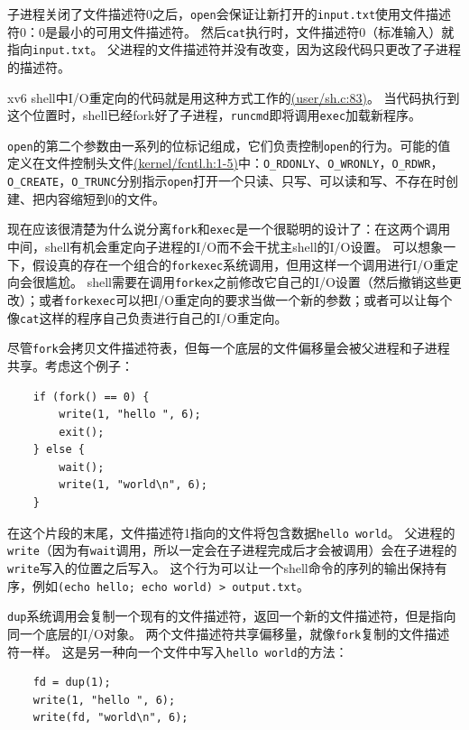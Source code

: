 子进程关闭了文件描述符0之后，\texttt{open}会保证让新打开的\texttt{input.txt}使用文件描述符0：0是最小的可用文件描述符。
然后\texttt{cat}执行时，文件描述符0（标准输入）就指向\texttt{input.txt}。
父进程的文件描述符并没有改变，因为这段代码只更改了子进程的描述符。

xv6 shell中I/O重定向的代码就是用这种方式工作的\href{https://github.com/mit-pdos/xv6-riscv/blob/risc/user/sh.c#L83}{(user/sh.c:83)}。
当代码执行到这个位置时，shell已经fork好了子进程，\texttt{runcmd}即将调用\texttt{exec}加载新程序。

\texttt{open}的第二个参数由一系列的位标记组成，它们负责控制\texttt{open}的行为。可能的值定义在文件控制头文件\href{https://github.com/mit-pdos/xv6-riscv/blob/risc/kernel/fcntl.h#L1-L5}{(kernel/fcntl.h:1-5)}中：\texttt{O\_RDONLY}、\texttt{O\_WRONLY}，\texttt{O\_RDWR}，\texttt{O\_CREATE}，\texttt{O\_TRUNC}分别指示\texttt{open}打开一个只读、只写、可以读和写、不存在时创建、把内容缩短到0的文件。

现在应该很清楚为什么说分离\texttt{fork}和\texttt{exec}是一个很聪明的设计了：在这两个调用中间，shell有机会重定向子进程的I/O而不会干扰主shell的I/O设置。
可以想象一下，假设真的存在一个组合的\texttt{forkexec}系统调用，但用这样一个调用进行I/O重定向会很尴尬。
shell需要在调用\texttt{forkex}之前修改它自己的I/O设置（然后撤销这些更改）；或者\texttt{forkexec}可以把I/O重定向的要求当做一个新的参数；或者可以让每个像\texttt{cat}这样的程序自己负责进行自己的I/O重定向。

尽管\texttt{fork}会拷贝文件描述符表，但每一个底层的文件偏移量会被父进程和子进程共享。考虑这个例子：
\begin{lstlisting}
    if (fork() == 0) {
        write(1, "hello ", 6);
        exit();
    } else {
        wait();
        write(1, "world\n", 6);
    }
\end{lstlisting}
在这个片段的末尾，文件描述符1指向的文件将包含数据\texttt{hello world}。
父进程的\texttt{write}（因为有\texttt{wait}调用，所以一定会在子进程完成后才会被调用）会在子进程的\texttt{write}写入的位置之后写入。
这个行为可以让一个shell命令的序列的输出保持有序，例如\texttt{(echo hello; echo world) > output.txt}。

\texttt{dup}系统调用会复制一个现有的文件描述符，返回一个新的文件描述符，但是指向同一个底层的I/O对象。
两个文件描述符共享偏移量，就像\texttt{fork}复制的文件描述符一样。
这是另一种向一个文件中写入\texttt{hello world}的方法：
\begin{lstlisting}
    fd = dup(1);
    write(1, "hello ", 6);
    write(fd, "world\n", 6);
\end{lstlisting}

